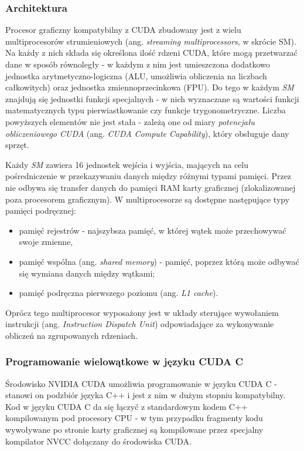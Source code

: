 \documentclass[12pt]{article}
\begin{document}
\subsubsection{Architektura}

Procesor graficzny kompatybilny z CUDA zbudowany jest z wielu multiprocesorów strumieniowych (ang. \textit{streaming multiprocessors}, w skrócie SM). Na każdy z nich składa się określona ilość rdzeni CUDA, które mogą przetwarzać dane w sposób równoległy - w każdym z nim jest umieszczona dodatkowo jednostka arytmetyczno-logiczna (ALU, umożliwia obliczenia na liczbach całkowitych) oraz jednostka zmiennoprzecinkowa (FPU). Do tego w każdym \textit{SM} znajdują się jednostki funkcji specjalnych - w nich wyznaczane są wartości funkcji matematycznych typu pierwiastkowanie czy funkcje trygonometryczne. Liczba powyższych elementów nie jest stała - zależą one od miary \textit{potencjału obliczeniowego CUDA} (ang. \textit{CUDA Compute Capability}), który obsługuje dany sprzęt.

Każdy \textit{SM} zawiera 16 jednostek wejścia i wyjścia, mających na celu pośredniczenie w przekazywaniu danych między różnymi typami pamięci. Przez nie odbywa się transfer danych do pamięci RAM karty graficznej (zlokalizowanej poza procesorem graficznym). W multiprocesorze są dostępne następujące typy pamięci podręcznej:

\begin{itemize}
\item pamięć rejestrów - najszybsza pamięć, w której wątek może przechowywać swoje zmienne,
\item pamięć wspólna (ang. \textit{shared memory}) - pamięć, poprzez którą może odbywać się wymiana danych między wątkami;
\item pamięć podręczna pierwszego poziomu (ang. \textit{L1 cache}).
\end{itemize}

Oprócz tego multiprocesor wyposażony jest w układy sterujące wywołaniem instrukcji (ang. \textit{Instruction Dispatch Unit}) odpowiadające za wykonywanie obliczeń na zgrupowanych rdzeniach.

\subsubsection{Programowanie wielowątkowe w języku CUDA C}

Środowisko NVIDIA CUDA umożliwia programowanie w języku CUDA C - stanowi on podzbiór języka C++ i jest z nim w dużym stopniu kompatybilny. Kod w języku CUDA C da się łączyć z standardowym kodem C++ kompilowanym pod procesory CPU - w tym przypadku fragmenty kodu wywoływane po stronie karty graficznej są kompilowane przez specjalny kompilator NVCC dołączany do środowiska CUDA. 
\end{document}
